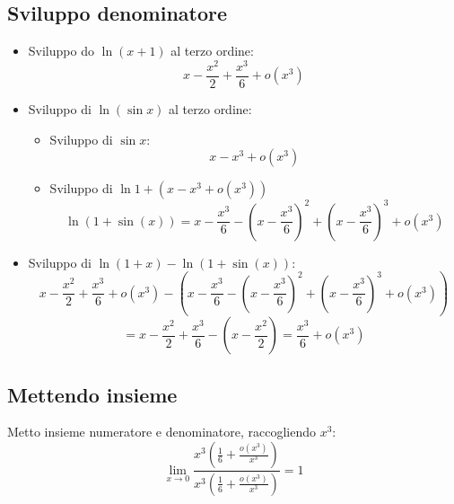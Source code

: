 \documentclass[12pt,a4paper,oneside]{article}
\begin{document}
\subsection{Sviluppo denominatore}
\begin{itemize}
	\item Sviluppo do $ \ln \left( x+1 \right)  $ al terzo ordine: 
		\[
			x-\frac{x^2}{2}+ \frac{x^3}{6} + o\left( x^3 \right) 
		\] 
	\item Sviluppo di $ \ln \left( \sin x \right)  $ al terzo ordine: 
		\begin{itemize}
			\item Sviluppo di $ \sin x $: 
				\[
					x - x^3 + o\left( x^3 \right) 
				\] 
			\item Sviluppo di $ \ln 1 + \left( x - x^3 + o\left( x^3 \right) \right)  $			
				\[
					\ln \left( 1+ \sin \left( x \right)  \right) = x - \frac{x^3}{6}- \left( x-\frac{x^3}{6} \right) ^2 + \left( x-\frac{x^3}{6} \right) ^3 + o\left( x^3 \right) 
				\] 
		\end{itemize}
	\item Sviluppo di $ \ln \left( 1+x \right) - \ln \left( 1+ \sin \left( x \right)  \right)  $: 
		\[
					x-\frac{x^2}{2}+ \frac{x^3}{6} + o\left( x^3 \right) 
		- \left( x - \frac{x^3}{6}- \left( x-\frac{x^3}{6} \right) ^2 + \left( x-\frac{x^3}{6} \right) ^3 + o\left( x^3 \right) \right) 
		\] 
		\[
			= x - \frac{x^2}{2}+ \frac{x^3}{6}- \left( x - \frac{x^2}{2} \right) = \frac{x^3}{6}+ o\left( x^3 \right) 
		\] 
\end{itemize}
\subsection{Mettendo insieme}
Metto insieme numeratore e denominatore, raccogliendo $ x^3 $:
\[
 \lim_{x \to 0} \frac{x^3\left( \frac{1}{6}+\frac{o\left( x^3 \right) }{x^3} \right) }{x^3\left( \frac{1}{6}+\frac{o\left( x^3 \right) }{x^3} \right) }= 1
\] 
\end{document}
